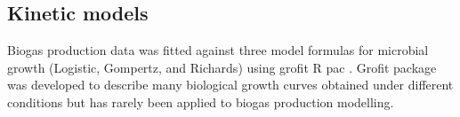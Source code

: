 \subsection{Kinetic models}
Biogas production data was fitted against three model formulas for microbial growth (Logistic, Gompertz, and Richards) using grofit R pac \cite{Kahm_2010}. Grofit package was developed to describe many biological growth curves obtained under different conditions but has rarely been applied to biogas production modelling. 